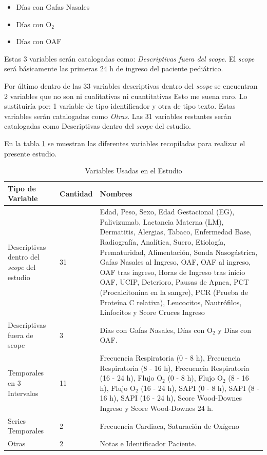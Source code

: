 \begin{itemize}
    \item Días con Gafas Nasales
    \item Días con O$_2$
    \item Días con OAF
\end{itemize}

Estas 3 variables serán catalogadas como: \textit{Descriptivas fuera del scope}. El \textit{scope} será básicamente las primeras 24 h de ingreso del paciente pediátrico.

Por último dentro de las 33 variables descriptivas dentro del \textit{scope} se encuentran {\color{red} 2 variables que no son ni cualitativas ni cuantitativas} {\color{blue} Esto me suena raro. Lo sustituiría por: 1 variable de tipo identificador y otra de tipo texto}. Estas variables serán catalogadas como \textit{Otras}. Las 31 variables restantes serán catalogadas como Descriptivas dentro del \textit{scope} del estudio.

En la tabla \ref{tabla:variables_estudio} se muestran las diferentes variables recopiladas para realizar el presente estudio. 

\begin{table}[H]
    \centering
        \begin{tabular}{| m{5cm} | m{1.75cm} | m{7cm} |}
            \hline Tipo de Variable & Cantidad & Nombres  \\ \hline
            Descriptivas dentro del \textit{scope} del estudio & 31 & Edad, Peso, Sexo, Edad Gestacional (EG), Palivizumab, Lactancia Materna (LM), Dermatitis, Alergias, Tabaco, Enfermedad Base, Radiografía, Analítica, Suero, Etiología, Prematuridad, Alimentación, Sonda Nasogástrica, Gafas Nasales al Ingreso, OAF, OAF al ingreso, OAF tras ingreso, Horas de Ingreso tras inicio OAF, UCIP, Deterioro, Pausas de Apnea, PCT (Procalcitonina en la sangre), PCR (Prueba de Proteína C relativa), Leucocitos, Nautrófilos, Linfocitos y Score Cruces Ingreso  \\ \hline
            Descriptivas fuera de scope & 3 & Días con Gafas Nasales, Días con O$_2$ y Días con OAF. \\ \hline
            Temporales en 3 Intervalos & 11 & Frecuencia Respiratoria (0 - 8 h), Frecuencia Respiratoria (8 - 16 h),
            Frecuencia Respiratoria (16 - 24 h),
            Flujo O$_2$ (0 - 8 h),
            Flujo O$_2$ (8 - 16 h),
            Flujo O$_2$ (16 - 24 h),
            SAPI (0 - 8 h),
            SAPI (8 - 16 h), 
            SAPI (16 - 24 h), Score Wood-Downes Ingreso y Score Wood-Downes 24 h. \\ \hline
            Series Temporales & 2 & Frecuencia Cardiaca, Saturación de Oxígeno \\ \hline
            Otras & 2 & Notas e Identificador Paciente. \\ \hline
        \end{tabular}
    \caption{Variables Usadas en el Estudio}\label{tabla:variables_estudio}
\end{table}

